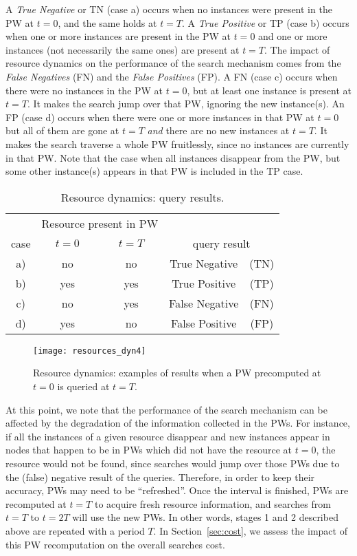 \documentclass[]{elsarticle}
\begin{document}
A \emph{True Negative} or TN (case a) occurs when no instances were present in the PW at $t\!=\!0$, and the same holds at \mbox{$t\!=\!T$}. A \emph{True Positive} or TP (case b) occurs when one or more instances are present in the PW at $t\!=\!0$ and one or more instances (not necessarily the same ones) are present at $t\!=\!T$. The impact of resource dynamics on the performance of the search mechanism comes from the \emph{False Negatives} (FN) and the \emph{False Positives} (FP). A FN (case c) occurs when there were no instances in the PW at $t\!=\!0$, but at least one instance is present at $t\!=\!T$. It makes the search jump over that PW, ignoring the new instance(s). An FP (case d) occurs when there were one or more instances in that PW at $t\!=\!0$ but all of them are gone at $t\!=\!T$ \emph{and} there are no new instances at $t\!=\!T$. It makes the search traverse a whole PW fruitlessly, since no instances are currently in that PW. Note that the case when all instances disappear from the PW, but some other instance(s) appears in that PW is included in the TP case.

\begin{table}
\centering
\begin{tabular}{ccccc} \hline
     & \multicolumn{2}{c}{\rule{0pt}{11pt}Resource present in PW} &  & \\ \cline{2-3}
case & \rule{0pt}{11pt} $t=0$ & $t=T$ &  \multicolumn{2}{c}{query result}  \\ \hline
a)   & no  & no  & True  Negative & (TN) \\
b)   & yes & yes & True  Positive & (TP) \\
c)   & no  & yes & False Negative & (FN) \\
d)   & yes & no  & False Positive & (FP) \\
\hline
\end{tabular}
\caption{Resource dynamics: query results.}
\label{tab:query_results}
\end{table}

\begin{figure}
 \centering
 \texttt{[image: resources\_dyn4]}
 \caption{Resource dynamics: examples of results when a PW precomputed at $t\!=\!0$ is queried at $t\!=\!T$.}
 \label{fig:resources_dyn}
\end{figure}

At this point, we note that the performance of the search mechanism can be affected by the degradation of the information collected in the PWs. For instance, if all the instances of a given resource disappear and 
new instances appear in nodes that happen to be in PWs which did not have the resource at $t=0$, the resource would not be found, since searches would jump over those PWs due to the (false) negative result of the queries.
Therefore, in order to keep their accuracy, PWs may need to be ``refreshed''. 
Once the interval is finished, PWs are recomputed at $t\!=\!T$ to acquire fresh resource information, and searches from $t\!=\!T$ to $t\!=\!2T$ will use the new PWs. In other words, stages 1 and 2 described above are repeated with a period $T$. In Section~\ref{sec:cost}, we assess the impact of this PW recomputation on the overall searches cost.
\end{document}
